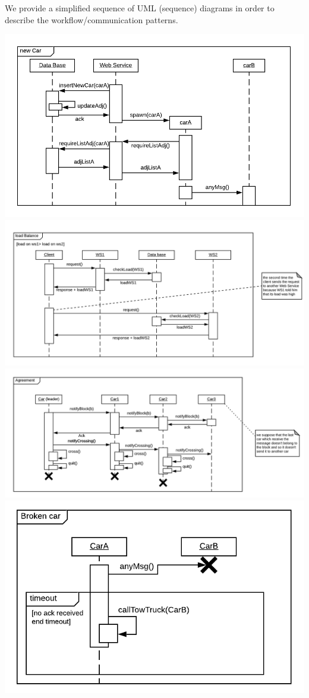 We provide a simplified sequence of UML (sequence) diagrams in order to describe the workflow/communication patterns.

\begin{center}
    \includegraphics[scale=0.8]{assets/ds2019_1.png}
    \includegraphics[scale=0.6]{assets/ds2019_2.png}
    \includegraphics[scale=0.6]{assets/ds2019_3.png}
    \includegraphics[scale=0.9]{assets/ds2019_4.png}
\end{center}

